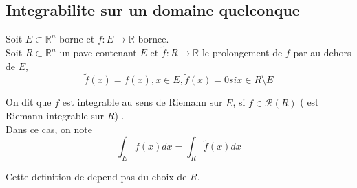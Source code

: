 \documentclass[../main.tex]{subfiles}
\begin{document}
\subsection{Integrabilite sur un domaine quelconque}

\begin{defn}
	Soit $E \subset \mathbb{R}^n$ borne et $f: E \to \mathbb{R}$ bornee.\\
	Soit $ R \subset \mathbb{R}^n$ un pave contenant $E$ et $\tilde f: R \to \mathbb{R}$ le prolongement de $f$ par au dehors de $E$,
	\[ 
		\tilde f( x) = f( x) , x \in E, \tilde f( x) =0 si x \in R \setminus E
	\]
	
	On dit que $f$ est integrable au sens de Riemann sur $E$, si $\tilde f \in \mathcal{R}( R) $ ( est Riemann-integrable sur $R$) .\\
	Dans ce cas, on note
	\[ 
		\int_E f( x) dx = \int _R \tilde f ( x) dx
	\]
	
\end{defn}
\begin{rmq}
Cette definition de depend pas du choix de $R$.
\end{rmq}
\end{document}
